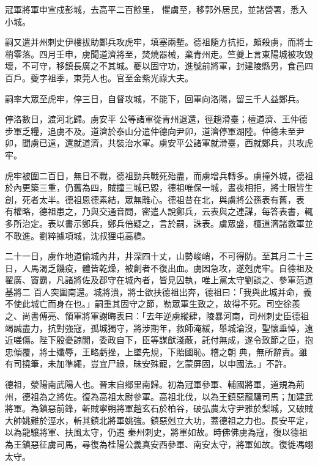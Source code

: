 \begin{pinyinscope}
 冠軍將軍申宣戍彭城，去高平二百餘里，
 懼虜至，移郭外居民，並諸營署，悉入小城。



 嗣又遣并州刺史伊樓拔助鄭兵攻虎牢，填塞兩塹。德祖隨方抗拒，頗殺虜，而將士稍零落。四月壬申，虜聞道濟將至，焚燒器械，棄青州走。竺夔上言東陽城被攻毀壞，不可守，移鎮長廣之不其城。夔以固守功，進號前將軍，封建陵縣男，食邑四百戶。夔字祖季，東莞人也。官至金紫光祿大夫。



 嗣率大眾至虎牢，停三日，自督攻城，不能下，回軍向洛陽，留三千人益鄭兵。



 停洛數日，渡河北歸。虜安平
 公等諸軍從青州退還，徑趨滑臺；檀道濟、王仲德步軍乏糧，追虜不及。道濟於泰山分遣仲德向尹卯，道濟停軍湖陸。仲德未至尹卯，聞虜已遠，還就道濟，共裝治水軍。虜安平公諸軍就滑臺，西就鄭兵，共攻虎牢。



 虎牢被圍二百日，無日不戰，德祖勁兵戰死殆盡，而虜增兵轉多。虜撞外城，德祖於內更築三重，仍舊為四，賊撞三城已毀，德祖唯保一城，晝夜相拒，將士眼皆生創，死者太半。德祖恩德素結，眾無離心。德祖昔在北，與虜將公孫表有舊，表
 有權略，德祖患之，乃與交通音問，密遣人說鄭兵，云表與之連謀，每答表書，輒多所治定。表以書示鄭兵，鄭兵倍疑之，言於嗣，誅表。虜眾盛，檀道濟諸救軍並不敢進。劉粹據項城，沈叔狸屯高橋。



 二十一日，虜作地道偷城內井，井深四十丈，山勢峻峭，不可得防。至其月二十三日，人馬渴乏饑疫，體皆乾燥，被創者不復出血。虜因急攻，遂剋虎牢。自德祖及翟廣、竇霸，凡諸將佐及郡守在城內者，皆見囚執，唯上黨太守劉談之、參軍范道基將二
 百人突圍南還。城將潰，將士欲扶德祖出奔，德祖曰：「我與此城并命，義不使此城亡而身在也。」嗣重其固守之節，勒眾軍生致之，故得不死。司空徐羨之、尚書傅亮、領軍將軍謝晦表曰：「去年逆虜縱肆，陵暴河南，司州刺史臣德祖竭誠盡力，抗對強寇，孤城獨守，將涉期年，救師淹緩，舉城淪沒，聖懷垂悼，遠近嗟傷。陛下殷憂諒闇，委政自下，臣等謀猷淺蔽，託付無成，遂令致節之臣，抱忠傾覆，將士殲辱，王略虧挫，上墜先規，下貽國恥。稽之朝
 典，無所辭責。雖有司撓筆，未加準繩，豈宜尸祿，昧安殊寵，乞蒙屏固，以申國法。」不許。



 德祖，滎陽南武陽人也。晉末自鄉里南歸。初為冠軍參軍、輔國將軍，道規為荊州，德祖為之將佐。復為高祖太尉參軍。高祖北伐，以為王鎮惡龍驤司馬；加建武將軍。為鎮惡前鋒，斬賊寧朔將軍趙玄石於柏谷，破弘農太守尹雅於梨城，又破賊大帥姚難於涇水，斬其鎮北將軍姚強。鎮惡剋立大功，蓋德祖之力也。長安平定，以為龍驤將軍、扶風太守，仍遷
 秦州刺史，將軍如故。時佛佛虜為寇，復以德祖為王鎮惡征虜司馬，尋復為桂陽公義真安西參軍、南安太守，將軍如故。復徙馮翊太守。




\end{pinyinscope}
